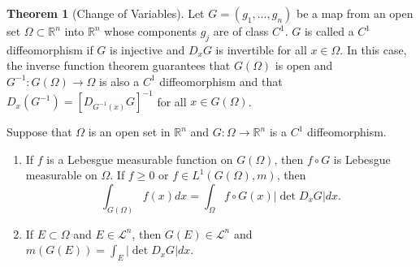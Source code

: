 \documentclass[12pt,a4paper]{book}
\newenvironment{enu}{\begin{enumerate}[(1)]}{\end{enumerate}}
\theoremstyle{definition}
\newtheorem{theo}[defn]{Theorem}
\begin{document}
\begin{theo}[Change of Variables]
    Let $G=\left(g_1, \ldots, g_n\right)$ be a map from an open set $\Omega \subset \mathbb{R}^n$ into $\mathbb{R}^n$ whose components $g_j$ are of class $C^1$. $G$ is called a $C^1$ diffeomorphism if $G$ is injective and $D_x G$ is invertible for all $x \in \Omega$. In this case, the inverse function theorem guarantees that $G(\Omega)$ is open and $G^{-1}: G(\Omega) \rightarrow \Omega$ is also a $C^1$ diffeomorphism and that $D_x\left(G^{-1}\right)=\left[D_{G^{-1}(x)} G\right]^{-1}$ for all $x \in G(\Omega)$.

    Suppose that $\Omega$ is an open set in $\mathbb{R}^n$ and $G: \Omega \rightarrow \mathbb{R}^n$ is a $C^1$ diffeomorphism.
    \begin{enu}
        \item If $f$ is a Lebesgue measurable function on $G(\Omega)$, then $f \circ G$ is Lebesgue measurable on $\Omega$. If $f \geq 0$ or $f \in L^1(G(\Omega), m)$, then
        $$
            \int_{G(\Omega)} f(x) d x=\int_{\Omega} f \circ G(x)\left|\operatorname{det} D_x G\right| d x .
        $$
        \item If $E \subset \Omega$ and $E \in \mathcal{L}^n$, then $G(E) \in \mathcal{L}^n$ and $m(G(E))=\int_E\left|\operatorname{det} D_x G\right| d x$.
    \end{enu}
\end{theo}



\newpage 
\end{document}
